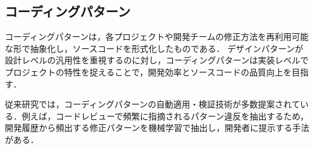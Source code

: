 \documentclass[submit,techrep,noauthor]{ipsj}
\begin{document}

\subsection{コーディングパターン}

コーディングパターンは，各プロジェクトや開発チームの修正方法を再利用可能な形で抽象化し，ソースコードを形式化したものである．
デザインパターン\cite{GoF}が設計レベルの汎用性を重視するのに対し，コーディングパターンは実装レベルでプロジェクトの特性を捉えることで，開発効率とソースコードの品質向上を目指す．

従来研究では，コーディングパターンの自動適用・検証技術が多数提案されている．例えば，コードレビューで頻繁に指摘されるパターン違反を抽出するため，開発履歴から頻出する修正パターンを機械学習で抽出し，開発者に提示する手法がある\cite{AutomaticPatch}\cite{findBugs}\cite{Relntancer}\cite{don'tDIY}．
\end{document}
